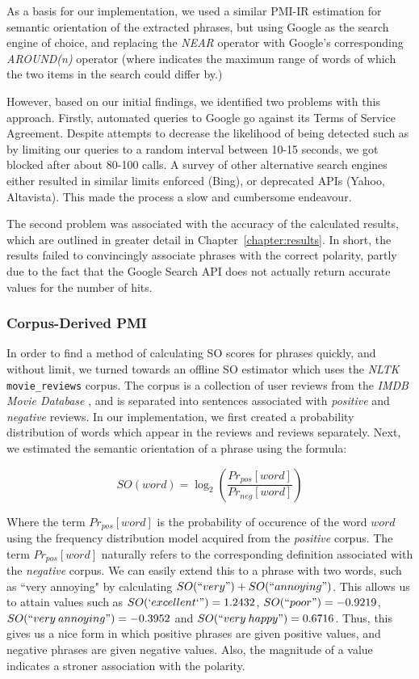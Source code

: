 \documentclass[11pt]{report} %
\begin{document}
As a basis for our implementation, we used a similar PMI-IR estimation for semantic orientation of the extracted phrases, but using Google as the search engine of choice, and replacing the \textit{NEAR} operator with Google's corresponding \textit{AROUND(n)} operator (where  indicates the maximum range of words of which the two items in the search could differ by.)

However, based on our initial findings, we identified two problems with this approach. Firstly, automated queries to Google go against its Terms of Service Agreement. Despite attempts to decrease the likelihood of being detected such as by limiting our queries to a random interval between 10-15 seconds, we got blocked after about 80-100 calls. A survey of other alternative search engines either resulted in similar limits enforced (Bing), or deprecated APIs (Yahoo, Altavista). This made the process a slow and cumbersome endeavour.

The second problem was associated with the accuracy of the calculated results, which are outlined in greater detail in Chapter~\ref{chapter:results}. In short, the results failed to convincingly associate phrases with the correct polarity, partly due to the fact that the Google Search API does not actually return accurate values for the number of hits.

\subsubsection{Corpus-Derived PMI}
In order to find a method of calculating SO scores for phrases quickly, and without limit, we turned towards an offline SO estimator which uses the \textit{NLTK} \verb|movie_reviews| corpus. The corpus is a collection of user reviews from the \textit{IMDB Movie Database} , and is separated into sentences associated with \textit{positive} and \textit{negative} reviews. In our implementation, we first created a probability distribution of words which appear in the  reviews and  reviews separately. Next, we estimated the semantic orientation of a phrase using the formula:

\begin{equation*} SO(word) = \log_2 \left(\frac{Pr_{pos}[word]}{Pr_{neg}[word]}\right) \end{equation*}

Where the term $Pr_{pos}[word]$ is the probability of occurence of the word $word$ using the frequency distribution model acquired from the \textit{positive} corpus. The term $Pr_{pos}[word]$ naturally refers to the corresponding definition associated with the \textit{negative} corpus. We can easily extend this to a phrase with two words, such as ``very annoying" by calculating $SO(``very") + SO(``annoying")$. This allows us to attain values such as $SO(`excellent`")=1.2432$, $SO(``poor")=-0.9219$, $SO(``very \: annoying")=-0.3952$ and $SO(``very \: happy")=0.6716$. Thus, this gives us a nice form in which positive phrases are given positive values, and negative phrases are given negative values. Also, the magnitude of a value indicates a stroner association with the polarity.
\end{document}
